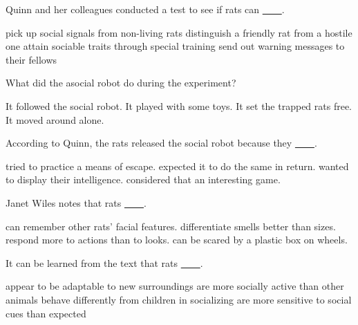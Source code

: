 \item Quinn and her colleagues conducted a test to see if rats can \uline{~~~~}.
\begin{tasks}
	\task pick up social signals from non-living rats
	\task distinguish a friendly rat from a hostile one
	\task attain sociable traits through special training
	\task send out warning messages to their fellows
\end{tasks}
\item What did the asocial robot do during the experiment?
\begin{tasks}
	\task It followed the social robot.
	\task It played with some toys.
	\task It set the trapped rats free.
	\task It moved around alone.
\end{tasks}
\item According to Quinn, the rats released the social robot because they \uline{~~~~}.
\begin{tasks}
	\task tried to practice a means of escape.
	\task expected it to do the same in return.
	\task wanted to display their intelligence.
	\task considered that an interesting game.
\end{tasks}
\item Janet Wiles notes that rats \uline{~~~~}.
\begin{tasks}
	\task can remember other rats' facial features.
	\task differentiate smells better than sizes.
	\task respond more to actions than to looks.
	\task can be scared by a plastic box on wheels.
\end{tasks}
\item It can be learned from the text that rats \uline{~~~~}.
\begin{tasks}
	\task appear to be adaptable to new surroundings
	\task are more socially active than other animals
	\task behave differently from children in socializing
	\task are more sensitive to social cues than expected
\end{tasks}